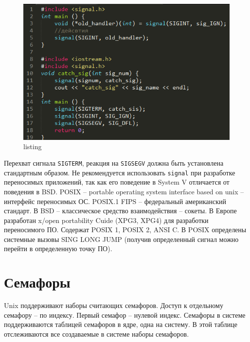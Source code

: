 \begin{figure}[H]
    \centering
    \includegraphics[width=\textwidth]{listing/2.png}
    \caption{listing}
\end{figure}

Перехват сигнала \verb|SIGTERM|, реакция на \verb|SIGSEGV| должна быть установлена стандартным образом.
Не рекомендуется использовать \verb|signal| при разработке переносимых приложений, так как его поведение в System V отличается от поведения в BSD. POSIX – portable operating system interface based on unix – интерфейс переносимых ОС. 
POSIX.1 FIPS – федеральный американский стандарт. В BSD – классическое средство взаимодействия – сокеты.
В Европе разработан x/open portability Cuide (XPG3, XPG4) для разработки переносимого ПО. Содержат POSIX 1, POSIX 2, ANSI C. 
В POSIX определены системные вызовы SING LONG JUMP (получив определенный сигнал можно перейти в определенную точку ПО). 

\section{Семафоры}

Unix поддерживают наборы считающих семафоров. Доступ к отдельному семафору – по индексу. Первый семафор – нулевой индекс. Семафоры в системе поддерживаются таблицей семафоров в ядре, одна на систему. В этой таблице отслеживаются все создаваемые в системе наборы семафоров. 

